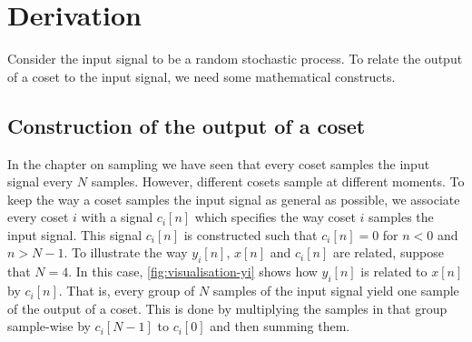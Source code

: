 \documentclass[a4paper, openany, oneside]{memoir}
\begin{document}
\section{Derivation}
\label{sec:reconstruction-derivation}
Consider the input signal to be a random stochastic process. To relate the output of a coset to the input signal, we need some mathematical constructs.

\subsection{Construction of the output of a coset}
In the chapter on sampling we have seen that every coset samples the input signal every $N$ samples. However, different cosets sample at different moments. To keep the way a coset samples the input signal as general as possible, we associate every coset $i$ with a signal $c_i[n]$ which specifies the way coset $i$ samples the input signal. This signal $c_i[n]$ is constructed such that $c_i[n] = 0$ for $n < 0$ and $n > N-1$. To illustrate the way $y_i[n]$, $x[n]$ and $c_i[n]$ are related, suppose that $N=4$. In this case, \cref{fig:visualisation-yi} shows how $y_i[n]$ is related to $x[n]$ by $c_i[n]$. That is, every group of $N$ samples of the input signal yield one sample of the output of a coset. This is done by multiplying the samples in that group sample-wise by $c_i[N-1]$ to $c_i[0]$ and then summing them.
\end{document}
